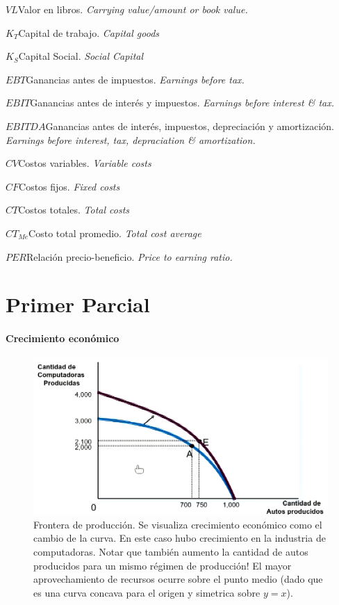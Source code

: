 \documentclass[twocolumn,10pt]{article}
\newcommand{\glossml}[3]{$#1$\indent #2 \emph{#3}  \par \vspace{.4cm} } %
\begin{document}
\glossml{VL}{Valor en libros.}{Carrying value/amount or book value.}
\glossml{K_T}{Capital de trabajo.}{Capital goods}
\glossml{K_S}{Capital Social.}{Social Capital}

\glossml{EBT}{Ganancias antes de impuestos.}{Earnings before tax.}
\glossml{EBIT}{Ganancias antes de interés y impuestos.}{Earnings before interest \& tax.}
\glossml{EBITDA}{Ganancias antes de interés, impuestos, depreciación y amortización.}{Earnings before interest, tax, depraciation \& amortization.}
\glossml{CV}{Costos variables.}{Variable costs}
\glossml{CF}{Costos fijos.}{Fixed costs}
\glossml{CT}{Costos totales.}{Total costs}
\glossml{CT_{Me}}{Costo total promedio.}{Total cost average}

\glossml{PER}{Relación precio-beneficio.}{Price to earning ratio.}


\newcommand{\fiN}{\ensuremath{f_i^N}}

\tableofcontents

\newpage
\part{Primer Parcial}
\subsection{Crecimiento econ\'omico}
\begin{figure}[htb!]
	\centering
	\includegraphics[width=1\linewidth]{fig/frontProd}
	\caption{Frontera de producci\'on. Se visualiza crecimiento econ\'omico como el cambio de la curva. En este caso hubo crecimiento en la industria de computadoras. Notar que tambi\'en aumento la cantidad de autos producidos para un mismo r\'egimen de producci\'on! El mayor aprovechamiento de recursos ocurre sobre el punto medio (dado que es una curva concava para el origen y simetrica sobre $y=x$).}
	\label{fig:frontprod}
\end{figure}
\end{document}

